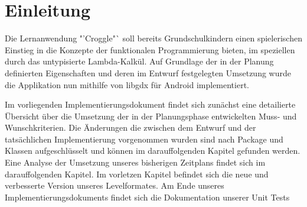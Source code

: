 \chapter{Einleitung}
Die Lernanwendung "'Croggle"` soll bereits Grundschulkindern einen spielerischen Einstieg in die Konzepte der funktionalen Programmierung bieten, im speziellen durch das untypisierte Lambda-Kalkül.
Auf Grundlage der in der Planung definierten Eigenschaften und deren im Entwurf festgelegten Umsetzung wurde die Applikation nun mithilfe von libgdx für Android implementiert.

Im vorliegenden Implementierungsdokument findet sich zunächst eine detailierte Übersicht über die Umsetzung der in der Planungsphase entwickelten Muss- und Wunschkriterien.
Die Änderungen die zwischen dem Entwurf und der tatsächlichen Implementierung vorgenommen wurden sind nach Package und Klassen aufgeschlüsselt und können im darauffolgenden Kapitel gefunden werden.
Eine Analyse der Umsetzung unseres bisherigen Zeitplans findet sich im darauffolgenden Kapitel.
Im vorletzen Kapitel befindet sich die neue und verbesserte Version unseres Levelformates.
Am Ende unseres Implementierungsdokuments findet sich die Dokumentation unserer Unit Tests
